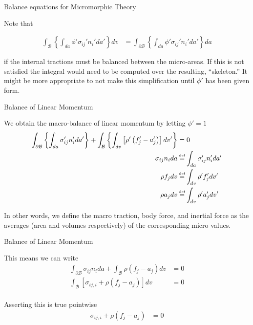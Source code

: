 \documentclass[11pt]{beamer}
\newcommand\defeq{\mathrel{\stackrel{\makebox[0pt]{\mbox{\normalfont\tiny def}}}{=}}}
\begin{document}
\begin{frame}{Balance equations for Micromorphic Theory}

Note that

\begin{align*}
\int_{\mathcal{B}} \left\{\int_{da} \phi' \sigma_{ij}' n_i' da' \right\} dv &= \int_{\partial \mathcal{B}} \left\{\int_{da} \phi' \sigma_{ij}' n_i' da' \right\} da
\end{align*}

if the internal tractions must be balanced between the micro-areas. If this is not satisfied the integral would need to be computed over the resulting, ``skeleton.'' It might be more appropriate to not make this simplification until $\phi'$ has been given form.

\end{frame}

\begin{frame}{Balance of Linear Momentum}

We obtain the macro-balance of linear momentum by letting $\phi'=1$
\begin{align*}
\int_{\partial \mathcal{B}} \left\{\int_{da}  \sigma_{ij}' n_i' da'\right\} + \int_{\mathcal{B}} \left\{\int_{dv} \left[\rho'\left(f_j' - a_j'\right) \right]dv'\right\} &= 0\\
\sigma_{ij}n_i da &\defeq \int_{da} \sigma_{ij}'n_i' da'\\
\rho f_j dv &\defeq \int_{dv} \rho' f_j' dv'\\
\rho a_j dv &\defeq \int_{dv} \rho' a_j' dv'\\
\end{align*}

In other words, we define the macro traction, body force, and inertial force as the averages (area and volumes respectively) of the corresponding micro values.

\end{frame}

\begin{frame}{Balance of Linear Momentum}

This means we can write
\begin{align*}
\int_{\partial \mathcal{B}} \sigma_{ij} n_i da + \int_{\mathcal{B}} \rho \left(f_j - a_j \right) dv &= 0\\
\int_{\mathcal{B}} \left[\sigma_{ij,i} + \rho\left(f_j - a_j \right) \right]dv &= 0\\
\end{align*}

Asserting this is true pointwise
\begin{align*}
\sigma_{ij,i} + \rho\left(f_j - a_j \right) &= 0\\
\end{align*}

\end{frame}
\end{document}

